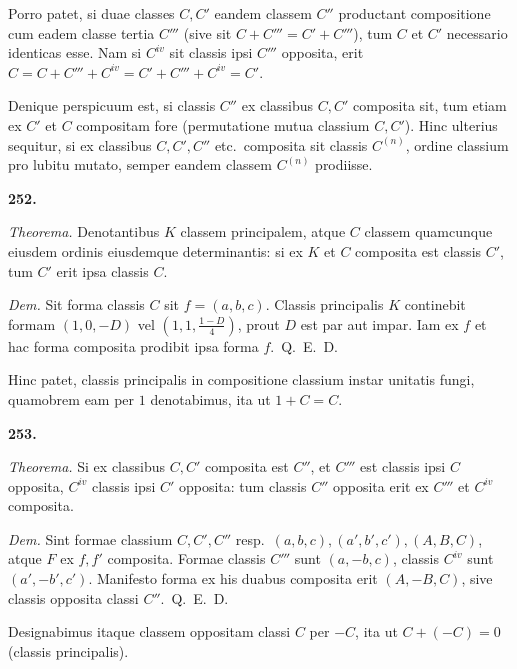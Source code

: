 \documentclass[12pt,a4paper]{article}
\theoremstyle{plain}
\theoremstyle{definition}
\theoremstyle{remark}
\begin{document}
Porro patet, si duae classes $C, C'$ eandem classem $C''$ productant compositione cum eadem classe tertia $C'''$ (sive sit $C + C''' = C' + C'''$), tum $C$ et $C'$ necessario identicas esse. Nam si $C^{iv}$ sit classis ipsi $C'''$ opposita, erit $C = C + C''' + C^{iv} = C' + C''' + C^{iv} = C'$.

Denique perspicuum est, si classis $C''$ ex classibus $C, C'$ composita sit, tum etiam ex $C'$ et $C$ compositam fore (permutatione mutua classium $C, C'$). Hinc ulterius sequitur, si ex classibus $C, C', C''$ etc.\ composita sit classis $C^{(n)}$, ordine classium pro lubitu mutato, semper eandem classem $C^{(n)}$ prodiisse.

\begin{center}\textbf{252.}\end{center}

\textit{Theorema.} Denotantibus $K$ classem principalem, atque $C$ classem quamcunque eiusdem ordinis eiusdemque determinantis: si ex $K$ et $C$ composita est classis $C'$, tum $C'$ erit ipsa classis $C$.

\textit{Dem.} Sit forma classis $C$ sit $f = (a,b,c)$. Classis principalis $K$ continebit formam $(1, 0, -D)$ vel $(1, 1, \tfrac{1-D}{4})$, prout $D$ est par aut impar. Iam ex $f$ et hac forma composita prodibit ipsa forma $f$.\ Q.\ E.\ D.

Hinc patet, classis principalis in compositione classium instar unitatis fungi, quamobrem eam per $1$ denotabimus, ita ut $1 + C = C$.

\begin{center}\textbf{253.}\end{center}

\textit{Theorema.} Si ex classibus $C, C'$ composita est $C''$, et $C'''$ est classis ipsi $C$ opposita, $C^{iv}$ classis ipsi $C'$ opposita: tum classis $C''$ opposita erit ex $C'''$ et $C^{iv}$ composita.

\textit{Dem.} Sint formae classium $C, C', C''$ resp.\ $(a,b,c), (a',b',c'), (A,B,C)$, atque $F$ ex $f, f'$ composita. Formae classis $C'''$ sunt $(a,-b,c)$, classis $C^{iv}$ sunt $(a',-b',c')$. Manifesto forma ex his duabus composita erit $(A,-B,C)$, sive classis opposita classi $C''$.\ Q.\ E.\ D.

Designabimus itaque classem oppositam classi $C$ per $-C$, ita ut $C + (-C) = 0$ (classis principalis).
\end{document}
